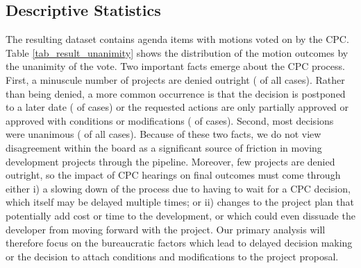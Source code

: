 \subsection{Descriptive Statistics} \label{sec_descriptive_statistics}

The resulting dataset contains  agenda items with motions voted on by the CPC. Table \ref{tab_result_unanimity} shows the distribution of the motion outcomes by the unanimity of the vote. Two important facts emerge about the CPC process. First, a minuscule number of projects are denied outright ( of all cases). Rather than being denied, a more common occurrence is that the decision is postponed to a later date ( of cases) or the requested actions are only partially approved or approved with conditions or modifications ( of cases). Second, most decisions were unanimous ( of all cases). Because of these two facts, we do not view disagreement within the board as a significant source of friction in moving development projects through the pipeline. Moreover, few projects are denied outright, so the impact of CPC hearings on final outcomes must come through either i) a slowing down of the process due to having to wait for a CPC decision, which itself may be delayed multiple times; or ii) changes to the project plan that potentially add cost or time to the development, or which could even dissuade the developer from moving forward with the project. Our primary analysis will therefore focus on the bureaucratic factors which lead to delayed decision making or the decision to attach conditions and modifications to the project proposal.


